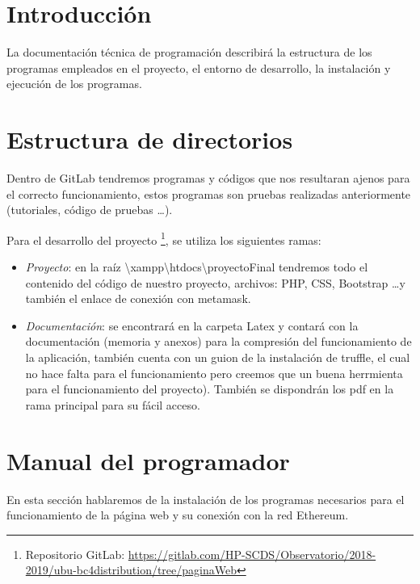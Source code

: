 
\section{Introducción}

La documentación técnica de programación describirá la estructura de los programas empleados en el proyecto, el entorno de desarrollo, la instalación y ejecución de los programas.

\section{Estructura de directorios}

Dentro de GitLab tendremos programas y códigos que nos resultaran ajenos para el correcto funcionamiento, estos programas son pruebas realizadas anteriormente (tutoriales, código de pruebas \ldots).

Para el desarrollo del proyecto \footnote{Repositorio GitLab: \url{https://gitlab.com/HP-SCDS/Observatorio/2018-2019/ubu-bc4distribution/tree/paginaWeb}}, se utiliza los siguientes ramas:

\begin{itemize}
	\item \textit{Proyecto}: en la raíz \textbackslash xampp\textbackslash htdocs\textbackslash proyectoFinal tendremos todo el contenido del código de nuestro proyecto, archivos: PHP, CSS, Bootstrap \ldots y también el enlace de conexión con metamask.
	\item \textit{Documentación}: se encontrará en la carpeta Latex y contará con la documentación (memoria y anexos) para la compresión del funcionamiento de la aplicación, también cuenta con un guion de la instalación de truffle, el cual no hace falta para el funcionamiento pero creemos que un buena herrmienta para el funcionamiento del proyecto). También se dispondrán los pdf en la rama principal para su fácil acceso.
\end{itemize}

\section{Manual del programador}

En esta sección hablaremos de la instalación de los programas necesarios para el funcionamiento de la página web y su conexión con la red Ethereum.

